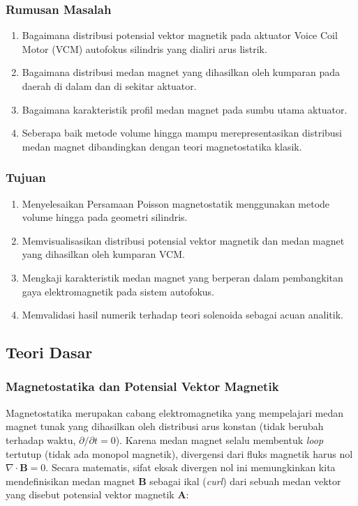 \documentclass[11pt,a4paper]{article}
\begin{document}
\subsubsection{Rumusan Masalah}
\begin{enumerate}[itemsep=1pt,topsep=2pt]
\item Bagaimana distribusi potensial vektor magnetik pada aktuator Voice Coil Motor (VCM) autofokus silindris yang dialiri arus listrik.
\item Bagaimana distribusi medan magnet yang dihasilkan oleh kumparan pada daerah di dalam dan di sekitar aktuator.
\item Bagaimana karakteristik profil medan magnet pada sumbu utama aktuator.
\item Seberapa baik metode volume hingga mampu merepresentasikan distribusi medan magnet dibandingkan dengan teori magnetostatika klasik.
\end{enumerate}

\subsubsection{Tujuan}
\begin{enumerate}[itemsep=1pt,topsep=2pt]
\item Menyelesaikan Persamaan Poisson magnetostatik menggunakan metode volume hingga pada geometri silindris.
\item Memvisualisasikan distribusi potensial vektor magnetik dan medan magnet yang dihasilkan oleh kumparan VCM.
\item Mengkaji karakteristik medan magnet yang berperan dalam pembangkitan gaya elektromagnetik pada sistem autofokus.
\item Memvalidasi hasil numerik terhadap teori solenoida sebagai acuan analitik.
\end{enumerate}

\subsection{Teori Dasar}

\subsubsection{Magnetostatika dan Potensial Vektor Magnetik}
Magnetostatika merupakan cabang elektromagnetika yang mempelajari medan magnet tunak yang dihasilkan oleh distribusi arus konstan (tidak berubah terhadap waktu, $\partial/\partial t = 0$). Karena medan magnet selalu membentuk \textit{loop} tertutup (tidak ada monopol magnetik), divergensi dari fluks magnetik harus nol $\nabla \cdot \mathbf{B} = 0$. Secara matematis, sifat eksak divergen nol ini memungkinkan kita mendefinisikan medan magnet $\mathbf{B}$ sebagai ikal (\textit{curl}) dari sebuah medan vektor yang disebut potensial vektor magnetik $\mathbf{A}$:
\end{document}
